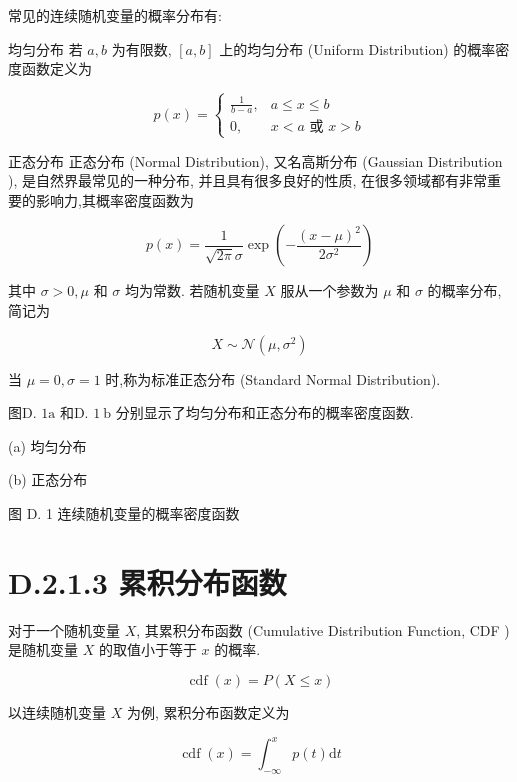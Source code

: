 \documentclass[10pt]{article}
\begin{document}
常见的连续随机变量的概率分布有:

均匀分布 若 $a, b$ 为有限数, $[a, b]$ 上的均匀分布 (Uniform Distribution) 的概率密度函数定义为

\[
p(x)=\left\{\begin{array}{cl}
\frac{1}{b-a}, & a \leq x \leq b  \tag{D.11}\\
0, & x<a \text { 或 } x>b
\end{array}\right.
\]

正态分布 正态分布 (Normal Distribution), 又名高斯分布 (Gaussian Distribution ), 是自然界最常见的一种分布, 并且具有很多良好的性质, 在很多领域都有非常重要的影响力,其概率密度函数为


\begin{equation*}
p(x)=\frac{1}{\sqrt{2 \pi} \sigma} \exp \left(-\frac{(x-\mu)^{2}}{2 \sigma^{2}}\right) \tag{D.12}
\end{equation*}


其中 $\sigma>0, \mu$ 和 $\sigma$ 均为常数. 若随机变量 $X$ 服从一个参数为 $\mu$ 和 $\sigma$ 的概率分布,简记为


\begin{equation*}
X \sim \mathcal{N}\left(\mu, \sigma^{2}\right) \tag{D.13}
\end{equation*}


当 $\mu=0, \sigma=1$ 时,称为标准正态分布 (Standard Normal Distribution).

图D. $1 \mathrm{a}$ 和D. $1 \mathrm{~b}$ 分别显示了均匀分布和正态分布的概率密度函数.



(a) 均匀分布



(b) 正态分布

图 D. 1 连续随机变量的概率密度函数

\section*{D.2.1.3 累积分布函数}
对于一个随机变量 $X$, 其累积分布函数 (Cumulative Distribution Function, CDF ) 是随机变量 $X$ 的取值小于等于 $x$ 的概率.


\begin{equation*}
\operatorname{cdf}(x)=P(X \leq x) \tag{D.14}
\end{equation*}


以连续随机变量 $X$ 为例, 累积分布函数定义为


\begin{equation*}
\operatorname{cdf}(x)=\int_{-\infty}^{x} p(t) \mathrm{d} t \tag{D.15}
\end{equation*}
\end{document}
